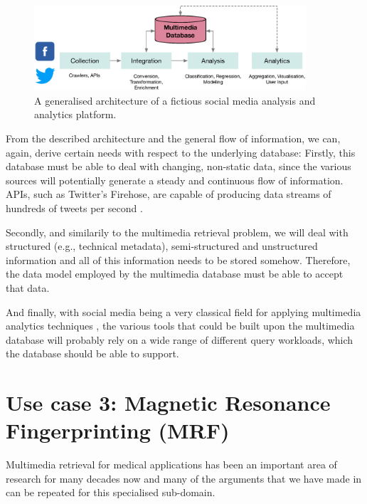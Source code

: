 \begin{figure}[tb]
    \centering
    \includegraphics[width=0.90\textwidth]{figures/social-media-architecture.eps}
    \caption{A generalised architecture of a fictious social media analysis and analytics platform.}
    \label{figure:social-media}
\end{figure}

From the described architecture and the general flow of information, we can, again, derive certain needs with respect to the underlying database: Firstly, this database must be able to deal with changing, non-static data, since the various sources will potentially generate a steady and  continuous flow of information. APIs, such as Twitter's Firehose, are capable of producing data streams of hundreds of tweets per second .

Secondly, and similarily to the multimedia retrieval problem, we will deal with structured (e.g., technical metadata), semi-structured and unstructured information and all of this information needs to be stored somehow. Therefore, the data model employed by the multimedia database must be able to accept that data. 

And finally, with social media being a very classical field for applying multimedia analytics techniques \cite{Pouyanfar:2018,Jonson:2016}, the various tools that could be built upon the multimedia database will probably rely on a wide range of different query workloads, which the database should be able to support.

\section{Use case 3: Magnetic Resonance Fingerprinting (MRF)}
\label{section:application_mrf}

Multimedia retrieval for medical applications has been an important area of research for many decades now \cite{Mueller:2017Retrieval,Mueller:2004Review} and many of the arguments that we have made in  can be repeated for this specialised sub-domain.

